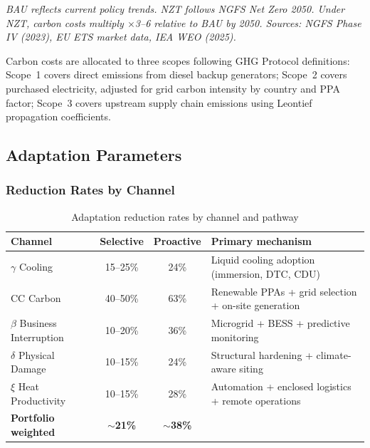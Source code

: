 \small\textit{BAU reflects current policy trends. NZT follows NGFS Net Zero 2050. Under NZT, carbon costs multiply $\times$3--6 relative to BAU by 2050. Sources: NGFS Phase IV (2023), EU ETS market data, IEA WEO (2025).}
\normalsize

Carbon costs are allocated to three scopes following GHG Protocol definitions: Scope~1 covers direct emissions from diesel backup generators; Scope~2 covers purchased electricity, adjusted for grid carbon intensity by country and PPA factor; Scope~3 covers upstream supply chain emissions using Leontief propagation coefficients.



\subsection{Adaptation Parameters}
\label{app:adaptation}

\subsubsection{Reduction Rates by Channel}

\begin{table}[H]
\centering
\small
\caption{Adaptation reduction rates by channel and pathway}
\label{tab:app_adaptation}
\begin{tabular}{@{}lccl@{}}
\toprule
\textbf{Channel} & \textbf{Selective} & \textbf{Proactive} & \textbf{Primary mechanism} \\
\midrule
$\gamma$ Cooling & 15--25\% & 24\% & Liquid cooling adoption (immersion, DTC, CDU) \\
CC Carbon & 40--50\% & 63\% & Renewable PPAs + grid selection + on-site generation \\
$\beta$ Business Interruption & 10--20\% & 36\% & Microgrid + BESS + predictive monitoring \\
$\delta$ Physical Damage & 10--15\% & 24\% & Structural hardening + climate-aware siting \\
$\xi$ Heat Productivity & 10--15\% & 28\% & Automation + enclosed logistics + remote operations \\
\midrule
\textbf{Portfolio weighted} & \textbf{$\sim$21\%} & \textbf{$\sim$38\%} & \\
\bottomrule
\end{tabular}
\end{table}

